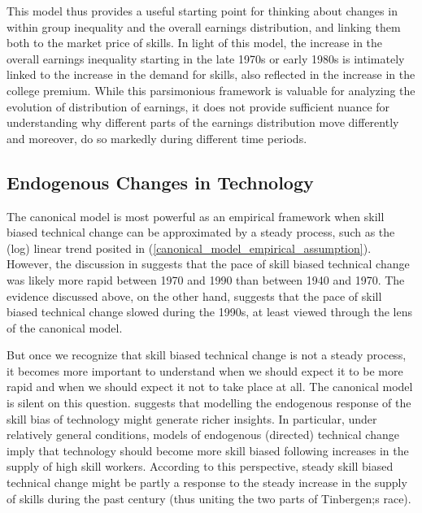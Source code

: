 \documentclass[12pt]{article}
\theoremstyle{definition}
\begin{document}
This model thus provides a useful starting point for thinking about changes in within group inequality and the overall earnings distribution, and linking them both to the market price of skills. In light of this model, the increase in the overall earnings inequality starting in the late 1970s or early 1980s is intimately linked to the increase in the demand for skills, also reflected in the increase in the college premium. While this parsimonious framework is valuable for analyzing the evolution of distribution of earnings, it does not provide sufficient nuance for understanding why different parts of the earnings distribution move differently and moreover, do so markedly during different time periods. 

\subsection{Endogenous Changes in Technology}

The canonical model is most powerful as an empirical framework when skill biased technical change can be approximated by a steady process, such as the (log) linear trend posited in (\ref{canonical_model_empirical_assumption}). However, the discussion in \citet{autorComputingInequalityHave1998} suggests that the pace of skill biased technical change was likely more rapid between 1970 and 1990 than between 1940 and 1970. The evidence discussed above, on the other hand, suggests that the pace of skill biased technical change slowed during the 1990s, at least viewed through the lens of the canonical model.

But once we recognize that skill biased technical change is not a steady process, it becomes more important to understand when we should expect it to be more rapid and when we should expect it not to take place at all. The canonical model is silent on this question. \citet{acemogluWhyNewTechnologies1998} suggests that modelling the endogenous response of the skill bias of technology might generate richer insights. In particular, under relatively general conditions, models of endogenous (directed) technical change imply that technology should become more skill biased following increases in the supply of high skill workers. According to this perspective, steady skill biased technical change might be partly a response to the steady increase in the supply of skills during the past century (thus uniting the two parts of Tinbergen;s race).

\end{document}
